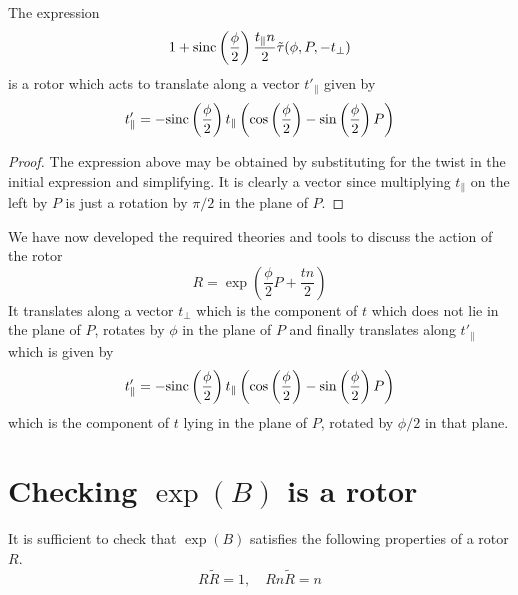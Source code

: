 \begin{lemma}
The expression
\[
 1 + \mathrm{sinc}\left(\frac{\phi}{2}\right)\frac{t_\parallel n}{2} \tilde{\tau}(\phi, P, - t_\perp)
\]
is a rotor which acts to translate along a vector $t'_\parallel$ given by
\[
t'_\parallel = - \mathrm{sinc}\left(\frac{\phi}{2}\right)
t_\parallel
\left(
\cos\left(\frac{\phi}{2}\right) -
\sin\left(\frac{\phi}{2}\right) P 
\right)
\]
\end{lemma}
\begin{proof}
The expression above may be obtained by substituting for the twist in the initial expression and simplifying. 
It is clearly a vector since multiplying $t_\parallel$ on the left by $P$ is just a rotation by $\pi / 2$ in the plane
of $P$.
\end{proof}

We have now developed the required theories and tools to discuss the
action of the rotor
\[
R = \exp\left(
\frac{\phi}{2} P + \frac{tn}{2}
\right)
\]
It translates along a vector $t_\perp$ which is the component of $t$ which does not lie in the
plane of $P$, rotates by $\phi$ in the plane of $P$ and finally translates along 
$t'_\parallel$ which is given by
\[
t'_\parallel =- \mathrm{sinc}\left(\frac{\phi}{2}\right)
t_\parallel
\left(
\cos\left(\frac{\phi}{2}\right) -
\sin\left(\frac{\phi}{2}\right) P 
\right)
\]
which is the component of $t$ lying in the
plane of $P$, rotated by $\phi/2$ in that plane.

\section{Checking $\exp(B)$ is a rotor}

It is sufficient to check that $\exp(B)$ satisfies the following
properties of a rotor $R$. %
\[
R\tilde{R} = 1, \quad Rn\tilde{R} = n
\]

